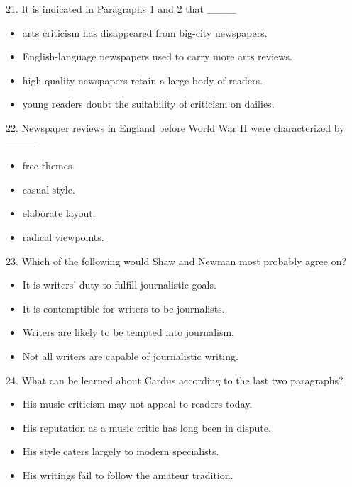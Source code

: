 \documentclass[UTF8,11pt]{ctexart}
\begin{document}
21. It is indicated in Paragraphs 1 and 2 that \_\_\_\_


\begin{itemize}[leftmargin=2em,itemsep=.2em,topsep=.4em]\item[A.] arts criticism has disappeared from big-city newspapers.
\item[B.] English-language newspapers used to carry more arts reviews.
\item[C.] high-quality newspapers retain a large body of readers.
\item[D.] young readers doubt the suitability of criticism on dailies.
\end{itemize}

22. Newspaper reviews in England before World War II were characterized by \_\_\_\_


\begin{itemize}[leftmargin=2em,itemsep=.2em,topsep=.4em]\item[A.] free themes.
\item[B.] casual style.
\item[C.] elaborate layout.
\item[D.] radical viewpoints.
\end{itemize}

23. Which of the following would Shaw and Newman most probably agree on?


\begin{itemize}[leftmargin=2em,itemsep=.2em,topsep=.4em]\item[A.] It is writers’ duty to fulfill journalistic goals.
\item[B.] It is contemptible for writers to be journalists.
\item[C.] Writers are likely to be tempted into journalism.
\item[D.] Not all writers are capable of journalistic writing.
\end{itemize}

24. What can be learned about Cardus according to the last two paragraphs?


\begin{itemize}[leftmargin=2em,itemsep=.2em,topsep=.4em]\item[A.] His music criticism may not appeal to readers today.
\item[B.] His reputation as a music critic has long been in dispute.
\item[C.] His style caters largely to modern specialists.
\item[D.] His writings fail to follow the amateur tradition.
\end{itemize}
\end{document}
